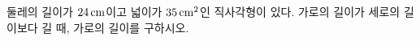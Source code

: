 둘레의 길이가 $24\mkern3mu \mathrm{cm}$이고 넓이가 $35\mkern3mu \mathrm{cm}^2$인 직사각형이 있다. 가로의 길이가 세로의 길이보다 길 때, 가로의 길이를 구하시오.
